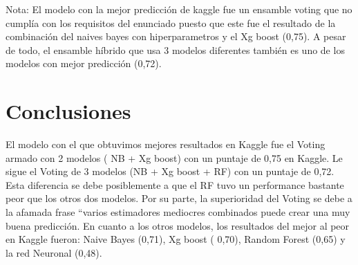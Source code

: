\documentclass{article}
\begin{document}
Nota: El modelo con la mejor predicción de kaggle fue un ensamble voting que no cumplía con los requisitos del enunciado puesto que este fue el resultado de la combinación del naives bayes con hiperparametros y el Xg boost (0,75). A pesar de todo, el ensamble híbrido que usa 3 modelos diferentes también es uno de los modelos con mejor predicción (0,72). 


\section*{Conclusiones}

El modelo con el que obtuvimos mejores resultados en Kaggle fue el Voting armado con 2 modelos ( NB + Xg boost) con un puntaje de 0,75 en Kaggle. Le sigue el Voting de 3 modelos (NB + Xg boost + RF) con un puntaje de 0,72. Esta diferencia se debe posiblemente a que el RF tuvo un performance bastante peor que los otros dos modelos. Por su parte, la superioridad del Voting se debe a la afamada frase “varios estimadores mediocres combinados puede crear una muy buena predicción.
En cuanto a los otros modelos, los resultados del mejor al peor en Kaggle fueron: Naive Bayes (0,71), Xg boost ( 0,70), Random Forest (0,65) y la red Neuronal (0,48).
\end{document}
